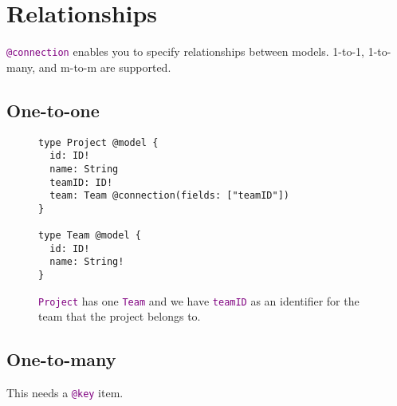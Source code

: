 \documentclass{tufte-handout}
\newcommand{\cde}[1]{
  \textcolor{purple}{\texttt{#1}}
}
\begin{document}

\hypertarget{relationships}{%
\section{Relationships}\label{relationships}}

\cde{@connection} enables you to specify relationships between models.
1-to-1, 1-to-many, and m-to-m are supported.

\hypertarget{one-to-one}{%
\subsection{One-to-one}\label{one-to-one}}

\begin{figure}[h]
\caption{\cde{Project} has one \cde{Team} and we have \cde{teamID} as an identifier for the team that the project belongs to.}
\begin{lstlisting}
type Project @model {
  id: ID!
  name: String
  teamID: ID!
  team: Team @connection(fields: ["teamID"])
}

type Team @model {
  id: ID!
  name: String!
}
\end{lstlisting}
\end{figure}

\hypertarget{one-to-many}{%
\subsection{One-to-many}\label{one-to-many}}

This needs a \cde{@key} item.
\end{document}
